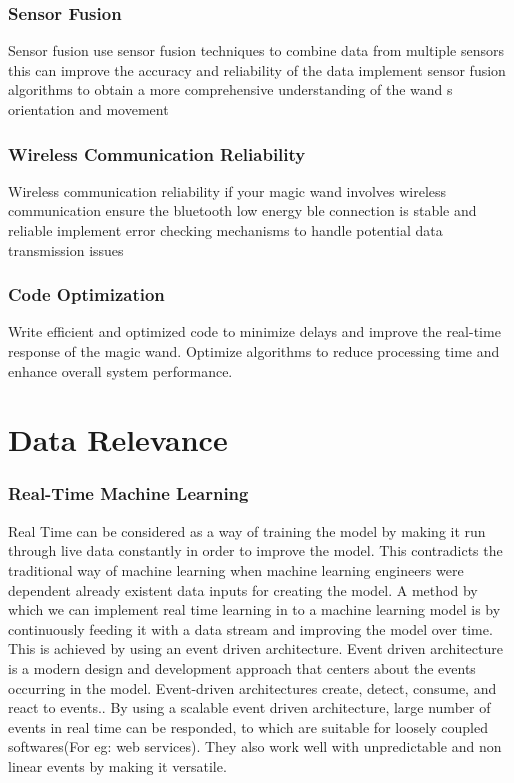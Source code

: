 \subsubsection{Sensor Fusion}
	Sensor fusion use sensor fusion techniques to combine data from multiple sensors this can improve the accuracy and reliability of the data implement sensor fusion algorithms to obtain a more comprehensive understanding of the wand s orientation and movement
\subsubsection{Wireless Communication Reliability}
	Wireless communication reliability if your magic wand involves wireless communication ensure the bluetooth low energy ble connection is stable and reliable implement error checking mechanisms to handle potential data transmission issues \cite{Gomez:2012}
\subsubsection{Code Optimization}
	Write efficient and optimized code to minimize delays and improve the real-time response of the magic wand.
	Optimize algorithms to reduce processing time and enhance overall system performance.




\section{Data Relevance}
\subsubsection{Real-Time Machine Learning}
	Real Time can be considered as a way of training the model by making it run through live data constantly in order to improve the model. This contradicts the traditional way of machine learning when machine learning engineers were dependent already existent data inputs for creating the model. A method by which we can implement real time learning in to a machine learning model is by continuously feeding it with a data stream and improving the model over time. This is achieved by using an event driven architecture. Event driven architecture is a modern design and development approach that centers about the events occurring in the model. Event-driven architectures create, detect, consume, and react to events.\cite{Haz:2021}. By using a scalable event driven architecture, large number of events in real time can be responded, to which are suitable for loosely coupled softwares(For eg: web services). They also work well with unpredictable and non linear events by making it versatile. \cite{Haz:2021}



